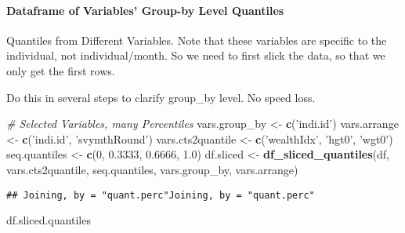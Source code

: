 \documentclass[
]{book}
\newenvironment{Shaded}{\begin{snugshade}}{\end{snugshade}}
\newcommand{\CommentTok}[1]{\textcolor[rgb]{0.56,0.35,0.01}{\textit{#1}}}
\newcommand{\DecValTok}[1]{\textcolor[rgb]{0.00,0.00,0.81}{#1}}
\newcommand{\FloatTok}[1]{\textcolor[rgb]{0.00,0.00,0.81}{#1}}
\newcommand{\KeywordTok}[1]{\textcolor[rgb]{0.13,0.29,0.53}{\textbf{#1}}}
\newcommand{\NormalTok}[1]{#1}
\newcommand{\OperatorTok}[1]{\textcolor[rgb]{0.81,0.36,0.00}{\textbf{#1}}}
\newcommand{\StringTok}[1]{\textcolor[rgb]{0.31,0.60,0.02}{#1}}
\begin{document}
\hypertarget{dataframe-of-variables-group-by-level-quantiles}{%
\paragraph{Dataframe of Variables' Group-by Level Quantiles}\label{dataframe-of-variables-group-by-level-quantiles}}

Quantiles from Different Variables. Note that these variables are specific to the individual, not individual/month. So we need to first slick the data, so that we only get the first rows.

Do this in several steps to clarify group\_by level. No speed loss.

\begin{Shaded}
\begin{Highlighting}[]
\CommentTok{# Selected Variables, many Percentiles}
\NormalTok{vars.group_by <-}\StringTok{ }\KeywordTok{c}\NormalTok{(}\StringTok{'indi.id'}\NormalTok{)}
\NormalTok{vars.arrange <-}\StringTok{ }\KeywordTok{c}\NormalTok{(}\StringTok{'indi.id'}\NormalTok{, }\StringTok{'svymthRound'}\NormalTok{)}
\NormalTok{vars.cts2quantile <-}\StringTok{ }\KeywordTok{c}\NormalTok{(}\StringTok{'wealthIdx'}\NormalTok{, }\StringTok{'hgt0'}\NormalTok{, }\StringTok{'wgt0'}\NormalTok{)}
\NormalTok{seq.quantiles <-}\StringTok{ }\KeywordTok{c}\NormalTok{(}\DecValTok{0}\NormalTok{, }\FloatTok{0.3333}\NormalTok{, }\FloatTok{0.6666}\NormalTok{, }\FloatTok{1.0}\NormalTok{)}
\NormalTok{df.sliced <-}\StringTok{ }\KeywordTok{df_sliced_quantiles}\NormalTok{(df, vars.cts2quantile, seq.quantiles, vars.group_by, vars.arrange)}
\end{Highlighting}
\end{Shaded}

\begin{verbatim}
## Joining, by = "quant.perc"Joining, by = "quant.perc"
\end{verbatim}

\begin{Shaded}
\end{Shaded}

\begin{Shaded}
\begin{Highlighting}[]
\NormalTok{df.sliced.quantiles}
\end{Highlighting}
\end{Shaded}
\end{document}
